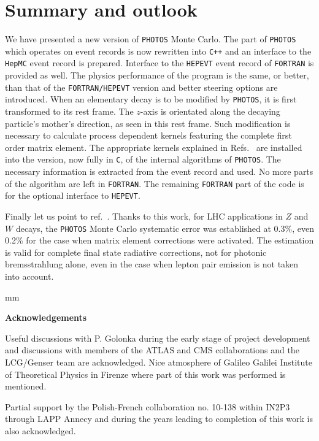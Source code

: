 \documentclass[]{Photos_interface_design}
\begin{document}
\section{Summary and outlook}
\label{sec:summary}
We have presented a new version  of {\tt PHOTOS} Monte Carlo. The part of 
{\tt PHOTOS} which operates on 
event records is now rewritten into {\tt C++} and an interface to the {\tt HepMC} event record 
is prepared. Interface to the {\tt HEPEVT} event record of {\tt FORTRAN} is provided as well.
The physics performance of the program is the
same, or better, than that of the {\tt FORTRAN/HEPEVT} version and better steering options are introduced. 
When an elementary decay is to be modified by {\tt PHOTOS}, 
it is first transformed to its rest frame. The $z$-axis is orientated along the decaying particle's mother's direction, 
as seen in this rest  frame. Such modification is 
necessary to calculate process dependent kernels
featuring the complete first order matrix element. 
The appropriate kernels explained in
Refs.~\cite{Golonka:2006tw,Nanava:2006vv,Nanava:2009vg} are installed
into the version, now fully in {\tt C}, of the internal algorithms of {\tt PHOTOS}. The necessary information is extracted
from the event record and  used.
No more  parts of the algorithm are left in {\tt FORTRAN}.
 The remaining {\tt FORTRAN} part of the code is for the optional interface to {\tt HEPEVT}. 


{Finally let us point to ref.~\cite{Arbuzov:2012dx}. Thanks to this work, for LHC applications in $Z$ and $W$ decays,
the {\tt PHOTOS} Monte Carlo systematic error was established at  0.3\%, even   0.2\% for the case when matrix element corrections were activated. The estimation is valid
for complete final state radiative corrections, not for photonic bremsstrahlung
alone, even in the case when lepton pair emission is not taken into account.
}

 mm

\centerline{\large\bf Acknowledgements}


Useful discussions with P. Golonka during the early stage of project development and discussions 
with members of the ATLAS and CMS collaborations and the LCG/Genser team 
are acknowledged.
Nice atmosphere of Galileo Galilei Institute of Theoretical Physics  in Firenze where part of this 
work was performed is mentioned. 

Partial support by the Polish-French collaboration
no. 10-138 within IN2P3 through LAPP Annecy and 
during the years leading to  completion of this work is
also acknowledged.
\end{document}
